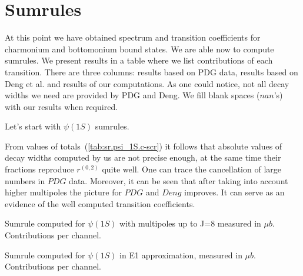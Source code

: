 \chapter{Sumrules}

At this point we have obtained spectrum and transition coefficients for charmonium and bottomonium bound states. We are able now to compute sumrules. We present results in a table where we list contributions of each transition. There are three columns: results based on PDG data, results based on Deng et al. and results of our computations. As one could notice, not all decay widths we need are provided by PDG and Deng. We fill blank spaces ($nan$'s) with our results when required.

Let's start with $\psi(1S)$ sumrules.

\begin{table}[H] 
\end{table}

From values of totals~(\cref{tab:sr.psi_1S.c-scr}) it follows that absolute values of decay widths computed by us are not precise enough, at the same time their fractions reproduce $r^{(0,2)}$ quite well. One can trace the cancellation of large numbers in $PDG$ data. Moreover, it can be seen that after taking into account higher multipoles the picture for $PDG$ and $Deng$ improves. It can serve as an evidence of the well computed transition coefficients.

\begin{table}
    {\caption{Sumrule computed for $\psi(1S)$ with multipoles up to J=8 measured in $\mu b$. Contributions per channel.}}
    
\end{table}

\begin{table}[H]
    {\caption{Sumrule computed for $\psi(1S)$ in E1 approximation, measured in $\mu b$. Contributions per channel.}}
    
\end{table}

